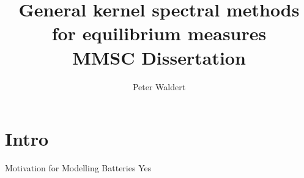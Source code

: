 \documentclass[aspectratio=169,hyperref={colorlinks=true}]{beamer}
\title{General kernel spectral methods for equilibrium measures \\ \normalsize MMSC Dissertation}
\author{Peter Waldert}
\institute{Mathematical Institute \\ University of Oxford}
\date{} %
\begin{document}
  {\frame{\titlepage}}

  \section{Intro}
  \begin{frame}{Motivation for Modelling Batteries}
    Yes
  \end{frame}
\end{document}
